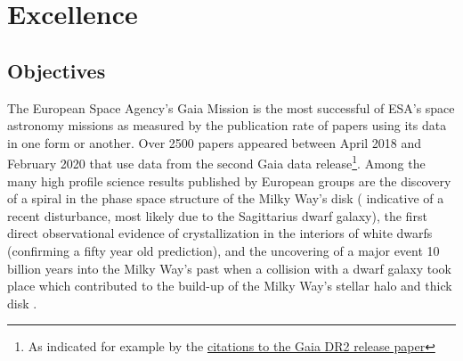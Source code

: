 \renewcommand{\thetable}{\thesection\alph{table}}

\chapter[Excellence]{Excellence}
\label{cha:excellence}

\section{Objectives}
\label{sec:objectives}

The European Space Agency's Gaia Mission \cite{2016A&A...595A...1G} is the most successful of ESA's space astronomy
missions as measured by the publication rate of papers using its data in one form or another. Over 2500 papers appeared
between April 2018 and February 2020 that use data from the second Gaia data release\footnote{As indicated for example by the \href{https://ui.adsabs.harvard.edu/search/q=citations(bibcode\%3A2018A\%26A...616A...1G)&sort=date\%20desc\%2C\%20bibcode\%20desc&p_=0}{citations to the Gaia DR2 release paper}}. Among the many high profile science
results published by European groups are the discovery of a spiral in the phase space structure of the Milky Way's disk
(\cite{2018Natur.561..360A} indicative of a recent disturbance, most likely due to the Sagittarius dwarf galaxy), the
first direct observational evidence of crystallization in the interiors of white dwarfs \cite{2019Natur.565..202T} (confirming a fifty year old prediction), and the uncovering of a major event 10 billion years into the Milky Way's past
when a collision with a dwarf galaxy took place which contributed to the build-up of the Milky Way's stellar halo and
thick disk \cite{2018Natur.563...85H, 2018MNRAS.478..611B, 2019arXiv190904679B}. 

